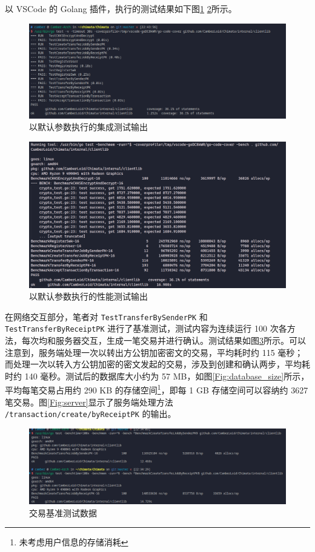 以 VSCode 的 Golang 插件，执行的测试结果如下图\ref{Fig:test} \ref{Fig:benchmark}所示。 

\begin{figure}[h]
    \centering
    \includegraphics[width=0.9\linewidth]{./Figures/Test.png}
    \caption{以默认参数执行的集成测试输出}\label{Fig:test}
\end{figure}

\begin{figure}
    \centering
    \includegraphics[width=0.9\linewidth]{./Figures/Bench_Overall.png}
    \caption{以默认参数执行的性能测试输出}\label{Fig:benchmark}
\end{figure}


在网络交互部分，笔者对 \verb|TestTransferBySenderPK| 和 \\
\verb|TestTransferByReceiptPK| 进行了基准测试，测试内容为连续运行 100 次各方法，每次均和服务器交互，生成一笔交易并进行确认。测试结果如图\ref{Fig:bench_transaction}所示。可以注意到，服务端处理一次以转出方公钥加密密文的交易，平均耗时约 115 毫秒；而处理一次以转入方公钥加密的密文发起的交易，涉及到创建和确认两步，平均耗时约 140 毫秒。测试后的数据库大小约为 57 MB，如图\ref{Fig:database_size}所示，平均每笔交易占用约 290 KB 的存储空间\footnote{未考虑用户信息的存储消耗}，即每 1 GB 存储空间可以容纳约 3627 笔交易。图\ref{Fig:server}显示了服务端处理方法 \verb|/transaction/create/byReceiptPK| 的输出。

\begin{figure}
    \centering
    \includegraphics[width=0.8\linewidth]{./Figures/Bench_Transaction_all.png}
    \caption{交易基准测试数据}\label{Fig:bench_transaction}
\end{figure}

